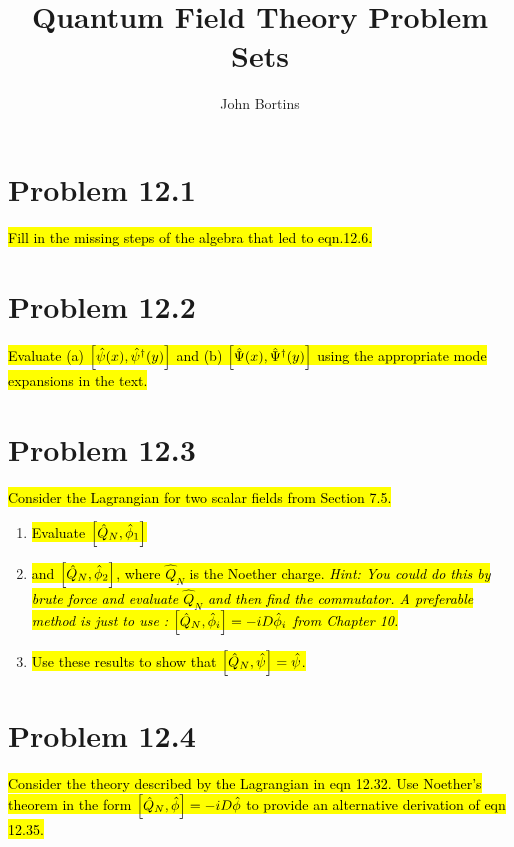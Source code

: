 \documentclass{article}
\title{Quantum Field Theory Problem Sets}
\author{John Bortins}
\begin{document}
\maketitle{}



\section*{Problem 12.1}
\begin{quoting}
    \hl{Fill in the missing steps of the algebra that led to eqn.12.6.}
\end{quoting}


\section*{Problem 12.2}
\begin{quoting}
    \hl{Evaluate (a) $\bqty{\hat{\psi}(x),\hat{\psi}^\dagger (y)}$ and (b) $\bqty{\hat{\Psi}(x),\hat{\Psi}^\dagger (y)}$ using the appropriate mode expansions in the text.}
\end{quoting}


\section*{Problem 12.3}
\begin{quoting}
    \hl{Consider the Lagrangian for two scalar fields from Section 7.5.}
    \begin{enumerate}[label=(\alph*)]
        \item \hl{Evaluate $\bqty{\hat{Q}_N,\hat{\phi}_1}$}
        \item \hl{and $\bqty{\hat{Q}_N,\hat{\phi}_2}$, where $\hat{Q}_N$ is the Noether charge. \emph{Hint: You could do this by brute force and evaluate $\hat{Q}_N$ and then find the commutator. A preferable method is just to use : $\bqty{\hat{Q}_N,\hat{\phi}_i}=-iD\hat{\phi}_i$ from Chapter 10.}}
        \item \hl{Use these results to show that $\bqty{\hat{Q}_N,\hat{\psi}}=\hat{\psi}$.}
    \end{enumerate}
\end{quoting}


\section*{Problem 12.4}
\begin{quoting}
    \hl{Consider the theory described by the Lagrangian in eqn 12.32. Use Noether's theorem in the form $\bqty{\hat{Q}_N,\hat{\phi}}=-iD\hat{\phi}$ to provide an alternative derivation of eqn 12.35.}
\end{quoting}
\end{document}
